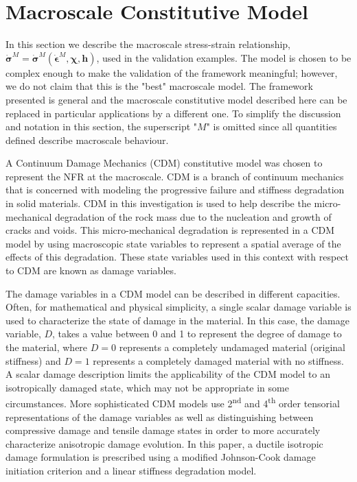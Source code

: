 \section{Macroscale Constitutive Model}

In this section we describe the macroscale stress-strain relationship, $\dot{\boldsymbol{\sigma}}^M=\dot{\boldsymbol{\sigma}}^M\left(\dot{\boldsymbol{\epsilon}}^M, \boldsymbol{\chi},\mathbf{h}\right)$, used in the validation examples. The model is chosen to be complex enough to make the validation of the framework meaningful; however, we do not claim that this is the "best" macroscale model. The framework presented is general and the macroscale constitutive model described here can be replaced in particular applications by a different one. To simplify the discussion and notation in this section, the superscript "$M$" is omitted since all quantities defined describe macroscale behaviour.

A Continuum Damage Mechanics (CDM) constitutive model was chosen to represent the NFR at the macroscale. CDM is a branch of continuum mechanics that is concerned with modeling the progressive failure and stiffness degradation in solid materials. CDM in this investigation is used to help describe the micro-mechanical degradation of the rock mass due to the nucleation and growth of cracks and voids. This micro-mechanical degradation is represented in a CDM model by using macroscopic state variables to represent a spatial average of the effects of this degradation. These state variables used in this context with respect to CDM are known as damage variables. 

The damage variables in a CDM model can be described in different capacities. Often, for mathematical and physical simplicity, a single scalar damage variable is used to characterize the state of damage in the material. In this case, the damage variable, $D$, takes a value between 0 and 1 to represent the degree of damage to the material, where $D=0$ represents a completely undamaged material (original stiffness) and $D=1$ represents a completely damaged material with no stiffness. A scalar damage description limits the applicability of the CDM model to an isotropically damaged state, which may not be appropriate in some circumstances. More sophisticated CDM models use 2\textsuperscript{nd} and 4\textsuperscript{th} order tensorial representations of the damage variables as well as distinguishing between compressive damage and tensile damage states in order to more accurately characterize anisotropic damage evolution. In this paper, a ductile isotropic damage formulation is prescribed using a modified Johnson-Cook damage initiation criterion and a linear stiffness degradation model.

